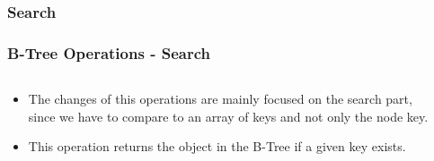 \documentclass{beamer}
\begin{document}
\begin{frame}[t,allowframebreaks]
    \subsubsection{Search}
    \frametitle{B-Tree Operations - Search}
    \vspace{-1cm}
    \begin{columns}
        \begin{column}{\textlecolumn}
            \begin{block}{}
                \begin{itemize}
                    \item The changes of this operations are mainly focused on the search part, since we have to compare to an array of keys and not only the node key.
                    \item This operation returns the object in the B-Tree if a given key exists.
                \end{itemize}
            \end{block}
        \end{column}
        \begin{column}{\textricolumn}
        \end{column}
    \end{columns}
    \btreeSearch
\end{frame}
\end{document}
